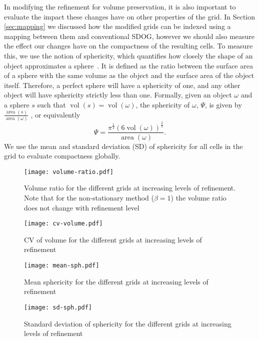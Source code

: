 In modifying the refinement for volume preservation, it is also important to evaluate the impact these changes have on other properties of the grid.
In Section \ref{sec:mapping} we discussed how the modified grids can be indexed using a mapping between them and conventional SDOG, however we should also measure the effect our changes have on the compactness of the resulting cells.
To measure this, we use the notion of sphericity, which quantifies how closely the shape of an object approximates a sphere~\cite{wadell1935volume}.
It is defined as the ratio between the surface area of a sphere with the same volume as the object and the surface area of the object itself.
Therefore, a perfect sphere will have a sphericity of one, and any other object will have sphericity strictly less than one.
Formally, given an object $\omega$ and a sphere $s$ such that $\operatorname{vol}(s) = \operatorname{vol}(\omega)$, the sphericity of $\omega$, $\Psi$, is given by $\frac{\operatorname{area}(s)}{\operatorname{area}(\omega)}$ , or equivalently 
%
\begin{equation}
\Psi = \frac{\pi^{\frac{1}{3}}\left( 6\operatorname{vol}(\omega) \right)^{\frac{2}{3}}}{\operatorname{area}(\omega)}.
\label{eq:sphericity}
\end{equation}
%
We use the mean and standard deviation (SD) of sphericity for all cells in the grid to evaluate compactness globally.


\begin{figure}[tb]
	\centering
	\texttt{[image: volume-ratio.pdf]}
	\caption[Title]{
		Volume ratio for the different grids at increasing levels of refinement.
		Note that for the non-stationary method ($\beta = 1$) the volume ratio does not change with refinement level
	}
	\label{fig:vr}
\end{figure}


\begin{figure}[tb]
	\centering
	\texttt{[image: cv-volume.pdf]}
	\caption[Title]{
		CV of volume for the different grids at increasing levels of refinement
	}
	\label{fig:cv}
\end{figure}


\begin{figure}[tb]
	\centering
	\texttt{[image: mean-sph.pdf]}
	\caption[Title]{
		Mean sphericity for the different grids at increasing levels of refinement
	}
	\label{fig:sph}
\end{figure}


\begin{figure}[tb]
	\centering
	\texttt{[image: sd-sph.pdf]}
	\caption[Title]{
		Standard deviation of sphericity for the different grids at increasing levels of refinement
	}
	\label{fig:sd-sph}
\end{figure}


